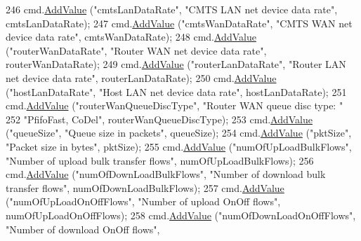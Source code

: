 \begin{DoxyCode}
246   cmd.\hyperlink{classns3_1_1CommandLine_addcfb546c7ad4c8bd0965654d55beb8e}{AddValue} (\textcolor{stringliteral}{"cmtsLanDataRate"}, \textcolor{stringliteral}{"CMTS LAN net device data rate"}, cmtsLanDataRate);
247   cmd.\hyperlink{classns3_1_1CommandLine_addcfb546c7ad4c8bd0965654d55beb8e}{AddValue} (\textcolor{stringliteral}{"cmtsWanDataRate"}, \textcolor{stringliteral}{"CMTS WAN net device data rate"}, cmtsWanDataRate);
248   cmd.\hyperlink{classns3_1_1CommandLine_addcfb546c7ad4c8bd0965654d55beb8e}{AddValue} (\textcolor{stringliteral}{"routerWanDataRate"}, \textcolor{stringliteral}{"Router WAN net device data rate"}, routerWanDataRate);
249   cmd.\hyperlink{classns3_1_1CommandLine_addcfb546c7ad4c8bd0965654d55beb8e}{AddValue} (\textcolor{stringliteral}{"routerLanDataRate"}, \textcolor{stringliteral}{"Router LAN net device data rate"}, routerLanDataRate);
250   cmd.\hyperlink{classns3_1_1CommandLine_addcfb546c7ad4c8bd0965654d55beb8e}{AddValue} (\textcolor{stringliteral}{"hostLanDataRate"}, \textcolor{stringliteral}{"Host LAN net device data rate"}, hostLanDataRate);
251   cmd.\hyperlink{classns3_1_1CommandLine_addcfb546c7ad4c8bd0965654d55beb8e}{AddValue} (\textcolor{stringliteral}{"routerWanQueueDiscType"}, \textcolor{stringliteral}{"Router WAN queue disc type: "}
252                 \textcolor{stringliteral}{"PfifoFast, CoDel"}, routerWanQueueDiscType);
253   cmd.\hyperlink{classns3_1_1CommandLine_addcfb546c7ad4c8bd0965654d55beb8e}{AddValue} (\textcolor{stringliteral}{"queueSize"}, \textcolor{stringliteral}{"Queue size in packets"}, queueSize);
254   cmd.\hyperlink{classns3_1_1CommandLine_addcfb546c7ad4c8bd0965654d55beb8e}{AddValue} (\textcolor{stringliteral}{"pktSize"}, \textcolor{stringliteral}{"Packet size in bytes"}, pktSize);
255   cmd.\hyperlink{classns3_1_1CommandLine_addcfb546c7ad4c8bd0965654d55beb8e}{AddValue} (\textcolor{stringliteral}{"numOfUpLoadBulkFlows"}, \textcolor{stringliteral}{"Number of upload bulk transfer flows"}, 
      numOfUpLoadBulkFlows);
256   cmd.\hyperlink{classns3_1_1CommandLine_addcfb546c7ad4c8bd0965654d55beb8e}{AddValue} (\textcolor{stringliteral}{"numOfDownLoadBulkFlows"}, \textcolor{stringliteral}{"Number of download bulk transfer flows"}, 
      numOfDownLoadBulkFlows);
257   cmd.\hyperlink{classns3_1_1CommandLine_addcfb546c7ad4c8bd0965654d55beb8e}{AddValue} (\textcolor{stringliteral}{"numOfUpLoadOnOffFlows"}, \textcolor{stringliteral}{"Number of upload OnOff flows"}, numOfUpLoadOnOffFlows);
258   cmd.\hyperlink{classns3_1_1CommandLine_addcfb546c7ad4c8bd0965654d55beb8e}{AddValue} (\textcolor{stringliteral}{"numOfDownLoadOnOffFlows"}, \textcolor{stringliteral}{"Number of download OnOff flows"}, 

\end{DoxyCode}
